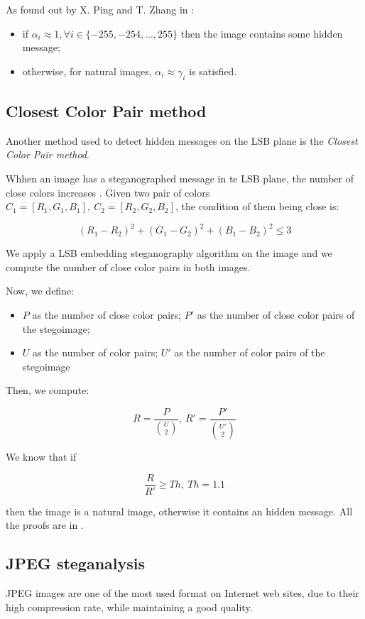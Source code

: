 \documentclass[../../main.tex]{subfiles}
\begin{document}
As found out by X. Ping and T. Zhang in
\cite{new-detection-lsb-steganography}:

\begin{itemize}
    \item if $\alpha_i \approx 1, \forall i \in \{-255, -254, ..., 255\}$
          then the image contains some hidden message;
    \item otherwise, for natural images, $\alpha_i \approx \gamma_i$ is
          satisfied.
\end{itemize}

\subsection{Closest Color Pair method}
Another method used to detect hidden messages on the LSB plane is the
\emph{Closest Color Pair method}.

Whhen an image has a steganographed message in te LSB plane, the number of
close colors increases \cite{detecting-lsb-steganography}. Given two pair of
colors $C_1=[R_1,G_1,B_1],\ C_2=[R_2,G_2,B_2]$, the condition of them being
close is:

\[ (R_1-R_2)^2+(G_1-G_2)^2+(B_1-B_2)^2 \leq 3 \]

We apply a LSB embedding steganography algorithm on the image and we compute
the number of close color pairs in both images.

Now, we define:

\begin{itemize}
    \item $P$ as the number of close color pairs; $P'$ as the number of
          close color pairs of the stegoimage;
    \item $U$ as the number of color pairs; $U'$ as the number of color
          pairs of the stegoimage
\end{itemize}

Then, we compute:

\[ R = \frac{P}{\binom{U}{2}},\ R' = \frac{P'}{\binom{U'}{2}} \]

We know that if

\[ \frac{R}{R'} \geq Th,\ Th = 1.1 \]

\noindent then the image is a natural image, otherwise it contains an hidden
message. All the proofs are in \cite{detecting-lsb-steganography}.

\subsection{JPEG steganalysis}
JPEG images are one of the most used format on Internet web sites, due to
their high compression rate, while maintaining a good quality.
\end{document}

